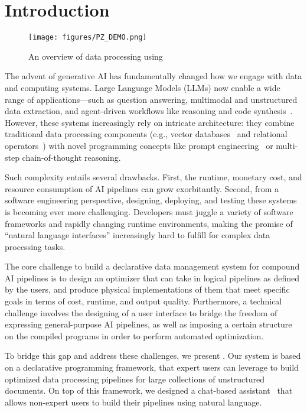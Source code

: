 \section{Introduction} \label{sec:introduction}

\begin{figure}
    \centering
    \texttt{[image: figures/PZ\_DEMO.png]}
    \caption{An overview of data processing using \sys}
    \label{fig:architecture-overview}
\end{figure}

The advent of generative AI has fundamentally changed how we engage with data and computing systems. Large Language Models (LLMs) now enable a wide range of applications—such as question answering, multimodal and unstructured data extraction, and agent-driven workflows like reasoning and code synthesis~\cite{yao2022react,hong2023metagpt}. However, these systems increasingly rely on intricate architecture: they combine traditional data processing components (e.g., vector databases~\cite{lewis2020retrieval} and relational operators~\cite{palimpzestCIDR}) with novel programming concepts like prompt engineering~\cite{dspy} or multi-step chain-of-thought reasoning.

Such complexity entails several drawbacks. First, the runtime, monetary cost, and resource consumption of AI pipelines can grow exorbitantly. Second, from a software engineering perspective, designing, deploying, and testing these systems is becoming ever more challenging. Developers must juggle a variety of software frameworks and rapidly changing runtime environments, making the promise of “natural language interfaces” increasingly hard to fulfill for complex data processing tasks.

The core challenge to build a declarative data management system for compound AI pipelines is to design an optimizer that can take in logical pipelines as defined by the users, and produce physical implementations of them that meet specific goals in terms of cost, runtime, and output quality.  Furthermore, a technical challenge involves the designing of a user interface to bridge the freedom of expressing general-purpose AI pipelines, as well as imposing a certain structure on the compiled programs in order to perform automated optimization.

To bridge this gap and address these challenges, we present \sys.
Our system is based on a declarative programming framework, that expert users can leverage to build optimized data processing pipelines for large collections of unstructured documents.
On top of this framework, we designed a chat-based assistant \chat\ that allows non-expert users to build their pipelines using natural language.

